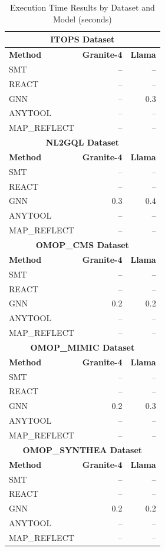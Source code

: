 \begin{table}[htbp]
\centering
\caption{Execution Time Results by Dataset and Model (seconds)}
\label{tab:execution_times}
\begin{tabular}{lrr}
\toprule
\multicolumn{3}{c}{\textbf{ITOPS Dataset}} \\
\midrule
\textbf{Method} & \textbf{Granite-4} & \textbf{Llama} \\
\midrule
SMT & -- & -- \\
REACT & -- & -- \\
GNN & -- & 0.3 \\
ANYTOOL & -- & -- \\
MAP_REFLECT & -- & -- \\
\midrule
\multicolumn{3}{c}{\textbf{NL2GQL Dataset}} \\
\midrule
\textbf{Method} & \textbf{Granite-4} & \textbf{Llama} \\
\midrule
SMT & -- & -- \\
REACT & -- & -- \\
GNN & 0.3 & 0.4 \\
ANYTOOL & -- & -- \\
MAP_REFLECT & -- & -- \\
\midrule
\multicolumn{3}{c}{\textbf{OMOP_CMS Dataset}} \\
\midrule
\textbf{Method} & \textbf{Granite-4} & \textbf{Llama} \\
\midrule
SMT & -- & -- \\
REACT & -- & -- \\
GNN & 0.2 & 0.2 \\
ANYTOOL & -- & -- \\
MAP_REFLECT & -- & -- \\
\midrule
\multicolumn{3}{c}{\textbf{OMOP_MIMIC Dataset}} \\
\midrule
\textbf{Method} & \textbf{Granite-4} & \textbf{Llama} \\
\midrule
SMT & -- & -- \\
REACT & -- & -- \\
GNN & 0.2 & 0.3 \\
ANYTOOL & -- & -- \\
MAP_REFLECT & -- & -- \\
\midrule
\multicolumn{3}{c}{\textbf{OMOP_SYNTHEA Dataset}} \\
\midrule
\textbf{Method} & \textbf{Granite-4} & \textbf{Llama} \\
\midrule
SMT & -- & -- \\
REACT & -- & -- \\
GNN & 0.2 & 0.2 \\
ANYTOOL & -- & -- \\
MAP_REFLECT & -- & -- \\
\bottomrule
\end{tabular}
\end{table}
